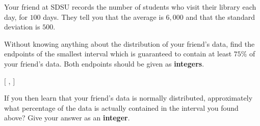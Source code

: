 \documentclass[twoside,12pt]{article}
\begin{document}
\begin{probset}
\begin{prob}
\begin{subprobset}
\begin{subprob}
    \smallskip


    \smallskip

    
\end{subprob}
\end{subprobset}
\end{prob}

\bigskip

\begin{prob}

Your friend at SDSU records the number of students who visit their library each day, for $100$ days. They tell you that the average is $6{,}000$ and that the standard deviation is $500$.

\begin{subprobset}
\begin{subprob}
    Without knowing anything about the distribution of your friend’s data, find the endpoints of the smallest interval which is guaranteed to contain at least $75\%$ of your friend’s data. Both endpoints should be given as \textbf{integers}.
    
    \begin{center}
        $\Biggr[$    ,  $\Biggr]$
    \end{center}
\end{subprob}
\begin{subprob}
    If you then learn that your friend's data is normally distributed, approximately what percentage of the data is actually contained in the interval you found above? Give your answer as an \textbf{integer}.

    \begin{center}
    \end{center}
\end{subprob}
\end{subprobset}

\end{prob}

\end{probset}
\end{document}
